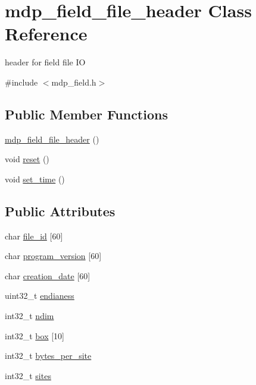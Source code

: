 \hypertarget{classmdp__field__file__header}{}\section{mdp\+\_\+field\+\_\+file\+\_\+header Class Reference}
\label{classmdp__field__file__header}


header for field file IO  




{\ttfamily \#include $<$mdp\+\_\+field.\+h$>$}

\subsection*{Public Member Functions}
\begin{DoxyCompactItemize}
\item 
\hyperlink{classmdp__field__file__header_ab097916f6edf2141bf8219384c5c2d95}{mdp\+\_\+field\+\_\+file\+\_\+header} ()
\item 
void \hyperlink{classmdp__field__file__header_a818d41240687af568d930b91ac687299}{reset} ()
\item 
void \hyperlink{classmdp__field__file__header_a6f944ea85e7d6176900139768098844a}{set\+\_\+time} ()
\end{DoxyCompactItemize}
\subsection*{Public Attributes}
\begin{DoxyCompactItemize}
\item 
char \hyperlink{classmdp__field__file__header_ab1b8a05b7908871a5cedff9e0bfc33fa}{file\+\_\+id} \mbox{[}60\mbox{]}
\item 
char \hyperlink{classmdp__field__file__header_abb1bd41d1e209241fb85b0996fed9765}{program\+\_\+version} \mbox{[}60\mbox{]}
\item 
char \hyperlink{classmdp__field__file__header_abc00b44219d97450f858530e2f357bd5}{creation\+\_\+date} \mbox{[}60\mbox{]}
\item 
uint32\+\_\+t \hyperlink{classmdp__field__file__header_aabc93969ba727e3e368608e21767a8d1}{endianess}
\item 
int32\+\_\+t \hyperlink{classmdp__field__file__header_a530fb61672665d9fc563d5c25c14aafb}{ndim}
\item 
int32\+\_\+t \hyperlink{classmdp__field__file__header_a4354675f8beac1523480de46d3441357}{box} \mbox{[}10\mbox{]}
\item 
int32\+\_\+t \hyperlink{classmdp__field__file__header_a904de1a1c617f55536ea6961693646f2}{bytes\+\_\+per\+\_\+site}
\item 
int32\+\_\+t \hyperlink{classmdp__field__file__header_a428a51466f48e613f85f9f9875a726bc}{sites}
\end{DoxyCompactItemize}
